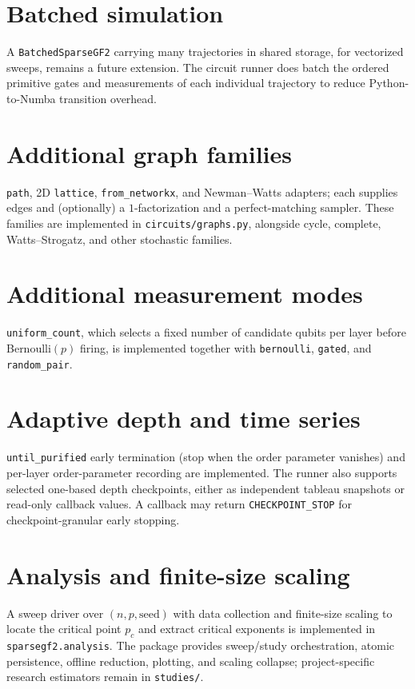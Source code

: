 \documentclass[11pt]{article}
\theoremstyle{definition}
\theoremstyle{plain}
\begin{document}
\section{Batched simulation}
A \texttt{BatchedSparseGF2} carrying many trajectories in shared storage, for
vectorized sweeps, remains a future extension. The circuit runner does batch the
ordered primitive gates and measurements of each individual trajectory to reduce
Python-to-Numba transition overhead.

\section{Additional graph families}
\texttt{path}, 2D \texttt{lattice}, \texttt{from\_networkx}, and Newman--Watts
adapters; each supplies edges and (optionally) a $1$-factorization and a
perfect-matching sampler. These families are implemented in
\texttt{circuits/graphs.py}, alongside cycle, complete, Watts--Strogatz, and
other stochastic families.

\section{Additional measurement modes}
\texttt{uniform\_count}, which selects a fixed number of candidate qubits per
layer before Bernoulli$(p)$ firing, is implemented together with
\texttt{bernoulli}, \texttt{gated}, and \texttt{random\_pair}.

\section{Adaptive depth and time series}
\texttt{until\_purified} early termination (stop when the order parameter
vanishes) and per-layer order-parameter recording are implemented. The runner
also supports selected one-based depth checkpoints, either as independent
tableau snapshots or read-only callback values. A callback may return
\texttt{CHECKPOINT\_STOP} for checkpoint-granular early stopping.

\section{Analysis and finite-size scaling}
\label{sec:roadmap-analysis}
A sweep driver over $(n,p,\text{seed})$ with data collection and finite-size
scaling to locate the critical point $p_c$ and extract critical exponents is
implemented in \texttt{sparsegf2.analysis}. The package provides sweep/study
orchestration, atomic persistence, offline reduction, plotting, and scaling
collapse; project-specific research estimators remain in \texttt{studies/}.
\end{document}
